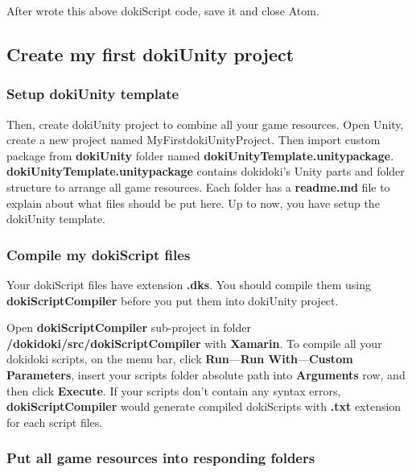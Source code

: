 After wrote this above dokiScript code, save it and close Atom.

\subsection{Create my first dokiUnity project}

\subsubsection{Setup dokiUnity template}

Then, create dokiUnity project to combine all your game resources. Open Unity, create a new project named MyFirstdokiUnityProject. Then import custom package from \textbf{dokiUnity} folder named \textbf{dokiUnityTemplate.unitypackage}. \textbf{dokiUnityTemplate.unitypackage} contains dokidoki's Unity parts and folder structure to arrange all game resources. Each folder has a \textbf{readme.md} file to explain about what files should be put here. Up to now, you have setup the dokiUnity template.

\subsubsection{Compile my dokiScript files}

Your dokiScript files have extension \textbf{.dks}. You should compile them using \textbf{dokiScriptCompiler} before you put them into dokiUnity project.

Open \textbf{dokiScriptCompiler} sub-project in folder \textbf{/dokidoki/src/dokiScriptCompiler} with \textbf{Xamarin}. To compile all your dokidoki scripts, on the menu bar, click \textbf{Run}---\textbf{Run With}---\textbf{Custom Parameters}, insert your scripts folder absolute path into \textbf{Arguments} row, and then click \textbf{Execute}. If your scripts don't contain any syntax errors, \textbf{dokiScriptCompiler} would generate compiled dokiScripts with \textbf{.txt} extension for each script files.

\subsubsection{Put all game resources into responding folders}

